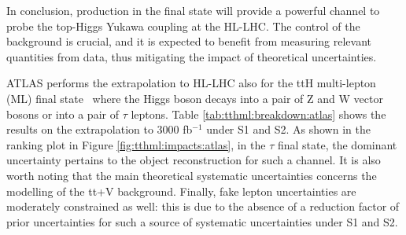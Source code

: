 In conclusion, \ttH production in the \Htobb final state will provide a powerful channel to probe the top-Higgs Yukawa coupling at the HL-LHC.
The control of the \ttHF background is crucial, and it is expected to benefit from measuring relevant quantities from data, thus mitigating the impact of theoretical uncertainties.

ATLAS performs the extrapolation to HL-LHC also for the ttH multi-lepton (ML) final state~\cite{ATLAS-PHYS-PUB-2018-XY} where the Higgs boson decays into a pair of Z and W vector bosons or into a pair of $\tau$ leptons. Table \ref{tab:tthml:breakdown:atlas} shows the results on the extrapolation to 3000 fb$^{-1}$ under S1 and S2. As shown in the ranking plot in Figure \ref{fig:tthml:impacts:atlas}, in the $\tau$ final state, the dominant uncertainty pertains to the object reconstruction for such a channel. It is also worth noting that the main theoretical systematic uncertainties concerns the modelling of the tt+V background. Finally, fake lepton uncertainties are moderately constrained as well: this is due to the absence of a reduction factor of prior uncertainties for such a source of systematic uncertainties under S1 and S2. 
